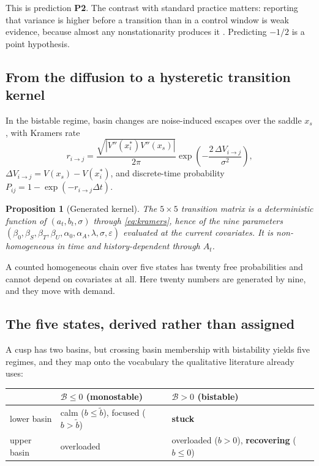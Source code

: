 \documentclass[conference]{IEEEtran}
\newtheorem{proposition}{Proposition}
\newcommand{\Bidx}{\mathcal{B}}
\begin{document}
\noindent This is prediction \textbf{P2}. The contrast with standard practice
matters: reporting that variance is higher before a transition than in a
control window is weak evidence, because almost any nonstationarity produces
it \cite{ditlevsen2010,boettiger2012}. Predicting $-1/2$ is a point hypothesis.

\subsection{From the diffusion to a hysteretic transition kernel}

In the bistable regime, basin changes are noise-induced escapes over the saddle
$x_s$, with Kramers rate \cite{kramers1940,gardiner2009}
\begin{equation}
r_{i\to j}
=\frac{\sqrt{|V''(x_i^\ast)V''(x_s)|}}{2\pi}
\exp\!\left(-\frac{2\,\Delta V_{i\to j}}{\sigma^{2}}\right),
\label{eq:kramers}
\end{equation}
$\Delta V_{i\to j}=V(x_s)-V(x_i^\ast)$, and discrete-time probability
$P_{ij}=1-\exp(-r_{i\to j}\Delta t)$.

\begin{proposition}[Generated kernel]
\label{prop:kernel}
The $5\times5$ transition matrix is a deterministic function of $(a_t,b_t,
\sigma)$ through \eqref{eq:kramers}, hence of the nine parameters
$(\beta_0,\beta_S,\beta_T,\beta_U,\alpha_0,\alpha_A,\lambda,\sigma,
\varepsilon)$ evaluated at the current covariates. It is non-homogeneous in
time and history-dependent through $A_t$.
\end{proposition}

\noindent A counted homogeneous chain over five states has twenty free
probabilities and cannot depend on covariates at all. Here twenty numbers are
generated by nine, and they move with demand.

\subsection{The five states, derived rather than assigned}
\label{sec:states}

A cusp has two basins, but crossing basin membership with bistability yields
five regimes, and they map onto the vocabulary the qualitative literature
already uses:

\begin{center}
\footnotesize
\begin{tabular}{@{}l p{} p{}@{}}
\toprule
& $\Bidx\le0$ (monostable) & $\Bidx>0$ (bistable)\\
\midrule
lower basin & calm ($b\le\tilde b$), focused ($b>\tilde b$) & \textbf{stuck}\\
upper basin & overloaded & overloaded ($b>0$), \textbf{recovering} ($b\le0$)\\
\bottomrule
\end{tabular}
\end{center}
\end{document}
